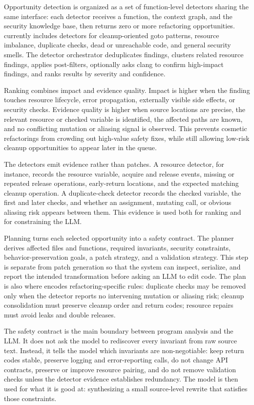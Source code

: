 Opportunity detection is organized as a set of function-level detectors sharing
the same interface: each detector receives a function, the context graph, and
the security knowledge base, then returns zero or more refactoring
opportunities. \SysName{} currently includes detectors for cleanup-oriented goto
patterns, resource imbalance, duplicate checks, dead or unreachable code, and
general security smells. The detector orchestrator deduplicates findings,
clusters related resource findings, applies post-filters, optionally asks clang
to confirm high-impact findings, and ranks results by severity and confidence.

Ranking combines impact and evidence quality. Impact is higher when the finding
touches resource lifecycle, error propagation, externally visible side effects,
or security checks. Evidence quality is higher when source locations are precise,
the relevant resource or checked variable is identified, the affected paths are
known, and no conflicting mutation or aliasing signal is observed. This prevents
cosmetic refactorings from crowding out high-value safety fixes, while still
allowing low-risk cleanup opportunities to appear later in the queue.

The detectors emit evidence rather than patches. A resource detector, for
instance, records the resource variable, acquire and
release events, missing or repeated release operations, early-return locations,
and the expected matching cleanup operation. A duplicate-check detector records
the checked variable, the first and later checks, and whether an assignment,
mutating call, or obvious aliasing risk appears between them. This evidence is
used both for ranking and for constraining the LLM.

Planning turns each selected opportunity into a safety contract. The planner
derives affected files and functions, required invariants, security constraints,
behavior-preservation goals, a patch strategy, and a validation strategy. This
step is separate from patch generation so that the system can inspect, serialize,
and report the intended transformation before asking an LLM to edit code. The
plan is also where \SysName{} encodes refactoring-specific rules: duplicate
checks may be removed only when the detector reports no intervening mutation or
aliasing risk; cleanup consolidation must preserve cleanup order and return
codes; resource repairs must avoid leaks and double releases.

The safety contract is the main boundary between program analysis and the LLM.
It does not ask the model to rediscover every invariant from raw source text.
Instead, it tells the model which invariants are non-negotiable: keep return
codes stable, preserve logging and error-reporting calls, do not change API
contracts, preserve or improve resource pairing, and do not remove validation
checks unless the detector evidence establishes redundancy. The model is then
used for what it is good at: synthesizing a small source-level rewrite that
satisfies those constraints.

